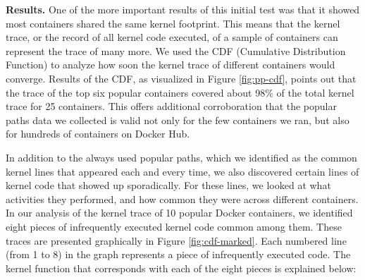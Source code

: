 \textbf{Results.}
One of the more important results of this initial test was that it showed most containers shared the same kernel footprint. 
This means that the kernel trace, or the record of all kernel code executed, of a sample of containers can represent the trace of many more. 
We used the CDF (Cumulative Distribution Function) to analyze how soon the kernel trace of different containers would converge. 
Results of the CDF, as visualized  in Figure \ref{fig:pp-cdf}, 
points out that the trace of the top six popular containers covered about 98\% of the total kernel trace for 25 containers. 
This offers additional corroboration that the popular paths data we collected is valid not only for the few containers we ran, but also for hundreds of containers on Docker Hub.  

In addition to the always used popular paths, which we identified as the common kernel lines that appeared each and every time, 
we also discovered certain lines of kernel code that showed up sporadically. 
For these lines, we looked at what activities they performed, and how common they were across different containers. 
In our analysis of the kernel trace of 10 popular Docker containers, we identified eight pieces of infrequently executed kernel code common among them. 
These traces are presented graphically in Figure \ref{fig:cdf-marked}. 
Each numbered line (from 1 to 8) in the graph represents a piece of infrequently executed code. 
The kernel function that corresponds with each of the eight pieces is explained below: 
